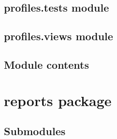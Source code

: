 \documentclass[letterpaper,10pt,english]{sphinxmanual}
\begin{document}
\subsection{profiles.tests module}
\label{profiles:profiles-tests-module}\label{profiles:module-profiles.tests}

\subsection{profiles.views module}
\label{profiles:profiles-views-module}\label{profiles:module-profiles.views}

\begin{fulllineitems}
\label{profiles:profiles.views.agrega_ganaderia_config}
\end{fulllineitems}


\begin{fulllineitems}
\label{profiles:profiles.views.home}
\end{fulllineitems}


\begin{fulllineitems}
\label{profiles:profiles.views.number_messages}
\end{fulllineitems}



\subsection{Module contents}
\label{profiles:module-contents}\label{profiles:module-profiles}

\section{reports package}
\label{reports:reports-package}\label{reports::doc}

\subsection{Submodules}
\label{reports:submodules}
\end{document}
